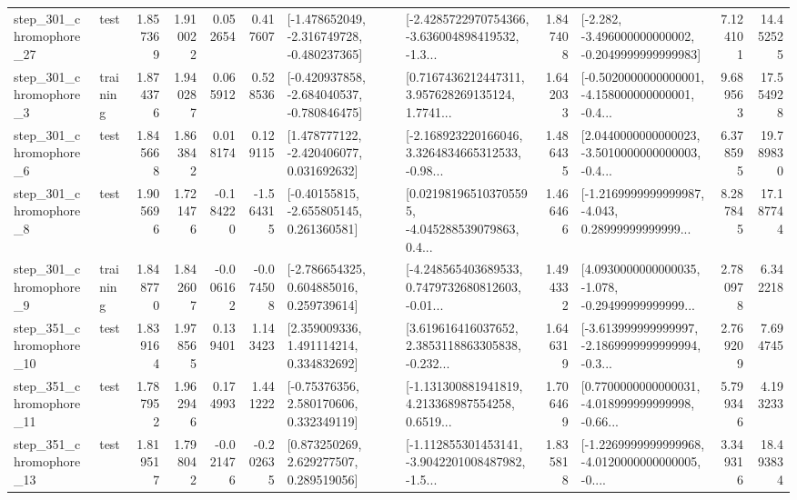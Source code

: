 \begin{tabular}{llrrrrllrlrr}
  step\_301\_chromophore\_27 &      test &      1.857369 &    1.910022 &      0.052654 &  0.417607 &  [-1.478652049, -2.316749728, -0.480237365] &  [-2.4285722970754366, -3.636004898419532, -1.3... &       1.847408 &  [-2.282, -3.496000000000002, -0.2049999999999983] &            7.124101 &         14.452525 \\
   step\_301\_chromophore\_3 &  training &      1.874376 &    1.940287 &      0.065912 &  0.528536 &  [-0.420937858, -2.684040537, -0.780846475] &  [0.7167436212447311, 3.957628269135124, 1.7741... &       1.642033 &  [-0.5020000000000001, -4.158000000000001, -0.4... &            9.689563 &         17.554928 \\
   step\_301\_chromophore\_6 &      test &      1.845668 &    1.863842 &      0.018174 &  0.129115 &    [1.478777122, -2.420406077, 0.031692632] &  [-2.168923220166046, 3.3264834665312533, -0.98... &       1.486435 &  [2.0440000000000023, -3.5010000000000003, -0.4... &            6.378595 &         19.789830 \\
   step\_301\_chromophore\_8 &      test &      1.905696 &    1.721476 &     -0.184220 & -1.564315 &    [-0.40155815, -2.655805145, 0.261360581] &  [0.021981965103705595, -4.045288539079863, 0.4... &       1.466466 &  [-1.2169999999999987, -4.043, 0.28999999999999... &            8.287845 &         17.187744 \\
   step\_301\_chromophore\_9 &  training &      1.848770 &    1.842607 &     -0.006162 & -0.074508 &    [-2.786654325, 0.604885016, 0.259739614] &  [-4.248565403689533, 0.7479732680812603, -0.01... &       1.494332 &  [4.0930000000000035, -1.078, -0.29499999999999... &            2.780978 &          6.342218 \\
  step\_351\_chromophore\_10 &      test &      1.839164 &    1.978565 &      0.139401 &  1.143423 &     [2.359009336, 1.491114214, 0.334832692] &  [3.619616416037652, 2.3853118863305838, -0.232... &       1.646319 &  [-3.613999999999997, -2.1869999999999994, -0.3... &            2.769209 &          7.694745 \\
  step\_351\_chromophore\_11 &      test &      1.787952 &    1.962946 &      0.174993 &  1.441222 &     [-0.75376356, 2.580170606, 0.332349119] &  [-1.131300881941819, 4.213368987554258, 0.6519... &       1.706469 &  [0.7700000000000031, -4.018999999999998, -0.66... &            5.799346 &          4.193233 \\
  step\_351\_chromophore\_13 &      test &      1.819517 &    1.798042 &     -0.021476 & -0.202635 &     [0.873250269, 2.629277507, 0.289519056] &  [-1.112855301453141, -3.9042201008487982, -1.5... &       1.835818 &  [-1.2269999999999968, -4.0120000000000005, -0.... &            3.349316 &         18.493834 \\

\end{tabular}
